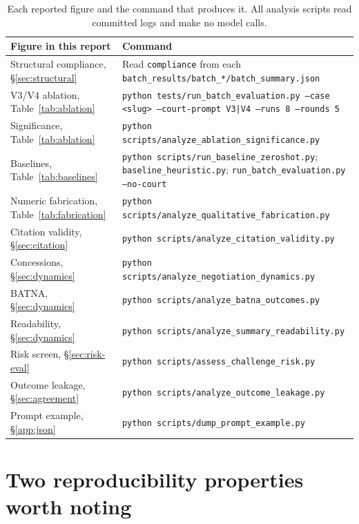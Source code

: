 \begin{table}[htbp]
\centering
\footnotesize
\caption[Reproduction commands]{Each reported figure and the command that
produces it. All analysis scripts read committed logs and make no model calls.}
\begin{tabularx}{\textwidth}{@{}>{\raggedright\arraybackslash}p{4.8cm}X@{}}
\toprule
\textbf{Figure in this report} & \textbf{Command} \\
\midrule
Structural compliance, \S\ref{sec:structural} &
  Read \texttt{compliance} from each \texttt{batch\_results/batch\_*/batch\_summary.json} \\
V3/V4 ablation, Table~\ref{tab:ablation} &
  \texttt{python tests/run\_batch\_evaluation.py --case <slug> --court-prompt V3|V4 --runs 8 --rounds 5} \\
Significance, Table~\ref{tab:ablation} &
  \texttt{python scripts/analyze\_ablation\_significance.py} \\
Baselines, Table~\ref{tab:baselines} &
  \texttt{python scripts/run\_baseline\_zeroshot.py}; \texttt{baseline\_heuristic.py}; \texttt{run\_batch\_evaluation.py --no-court} \\
Numeric fabrication, Table~\ref{tab:fabrication} &
  \texttt{python scripts/analyze\_qualitative\_fabrication.py} \\
Citation validity, \S\ref{sec:citation} &
  \texttt{python scripts/analyze\_citation\_validity.py} \\
Concessions, \S\ref{sec:dynamics} &
  \texttt{python scripts/analyze\_negotiation\_dynamics.py} \\
BATNA, \S\ref{sec:dynamics} &
  \texttt{python scripts/analyze\_batna\_outcomes.py} \\
Readability, \S\ref{sec:dynamics} &
  \texttt{python scripts/analyze\_summary\_readability.py} \\
Risk screen, \S\ref{sec:risk-eval} &
  \texttt{python scripts/assess\_challenge\_risk.py} \\
Outcome leakage, \S\ref{sec:agreement} &
  \texttt{python scripts/analyze\_outcome\_leakage.py} \\
Prompt example, \S\ref{app:json} &
  \texttt{python scripts/dump\_prompt\_example.py} \\
\bottomrule
\end{tabularx}
\end{table}

\section{Two reproducibility properties worth noting}

